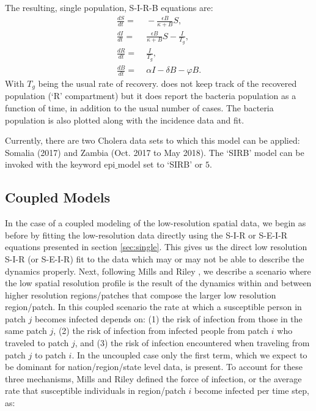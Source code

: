 \documentclass[a4paper]{article}
\begin{document}
The resulting, single population, S-I-R-B equations are:
\begin{align}
\frac{dS}{dt} =&\; - \frac{\epsilon B}{\kappa + B} S, \label{eq:eqSIRB1} \\
\frac{dI}{dt} =&\;   \frac{\epsilon B}{\kappa + B} S - \frac{I}{T_g}, \label{eq:eqSIRB2} \\
\frac{dR}{dt} =&\; \frac{I}{T_g}, \label{eq:eqSIRB3} \\
\frac{dB}{dt} =&\;  \alpha I - \delta B - \varphi B .  \label{eq:eqSIRB4}
\end{align}
With $T_g$ being the usual rate of recovery.  does not keep track of the recovered population (`R' compartment) but it does report the bacteria population as a function of time, in addition to the usual number of cases. The bacteria population is also plotted along with the incidence data and fit.

Currently, there are two Cholera data sets to which this model can be applied: Somalia (2017) and Zambia (Oct. 2017 to May 2018). The `SIRB' model can be invoked with the keyword epi$\_$model set to `SIRB' or $5$.


\subsection{Coupled Models}
In the case of a coupled modeling of the low-resolution spatial data, we begin as before by fitting the low-resolution data directly using the S-I-R or S-E-I-R equations presented in section \ref{sec:single}. This gives us the direct low resolution S-I-R (or S-E-I-R) fit to the data which may or may not be able to describe the dynamics properly.  Next, following Mills and Riley \cite{mills2014spatial}, we describe a scenario where the low spatial resolution profile is the result of the dynamics within and between higher resolution regions/patches that compose the larger low resolution region/patch. In this coupled scenario the rate at which a susceptible person in patch $j$ becomes infected depends on: (1) the risk of infection from those in the same patch $j$, (2) the risk of infection from infected people from patch $i$ who traveled to patch $j$, and (3) the risk of infection encountered when traveling from patch $j$ to patch $i$.  In the uncoupled case only the first term, which we expect to be dominant for nation/region/state level data, is present.  To account for these three mechanisms, Mills and Riley\cite{mills2014spatial} defined the force of infection, or the average rate that susceptible individuals in region/patch $i$ become infected per time step, as:
\end{document}
